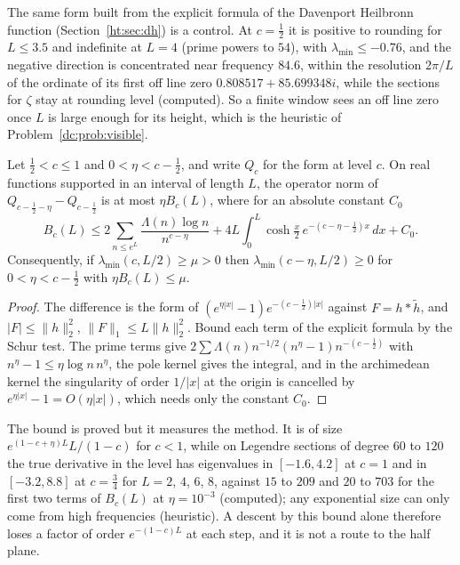 The same form built from the explicit formula of the Davenport Heilbronn function \cite{DH36} (Section~\ref{ht:sec:dh}) is a control. At $c=\frac12$ it is positive to rounding for $L\le3.5$ and indefinite at $L=4$ (prime powers to $54$), with $\lambda_{\min}\le-0.76$, and the negative direction is concentrated near frequency $84.6$, within the resolution $2\pi/L$ of the ordinate of its first off line zero $0.808517+85.699348i$, while the sections for $\zeta$ stay at rounding level (computed). So a finite window sees an off line zero once $L$ is large enough for its height, which is the heuristic of Problem~\ref{dc:prob:visible}.

\begin{proposition}\label{dc:prop:schur}
Let $\frac12<c\le1$ and $0<\eta<c-\frac12$, and write $Q_c$ for the form at level $c$. On real functions supported in an interval of length $L$, the operator norm of $Q_{c-\frac12-\eta}-Q_{c-\frac12}$ is at most $\eta B_c(L)$, where for an absolute constant $C_0$
\[
B_c(L)\le2\sum_{n\le e^L}\frac{\Lambda(n)\log n}{n^{c-\eta}}+4L\int_0^L\cosh\tfrac x2\,e^{-(c-\eta-\frac12)x}\,dx+C_0.
\]
Consequently, if $\lambda_{\min}(c,L/2)\ge\mu>0$ then $\lambda_{\min}(c-\eta,L/2)\ge0$ for $0<\eta<c-\frac12$ with $\eta B_c(L)\le\mu$.
\end{proposition}

\begin{proof}
The difference is the form of $(e^{\eta|x|}-1)e^{-(c-\frac12)|x|}$ against $F=h*\tilde h$, and $|F|\le\|h\|_2^2$, $\|F\|_1\le L\|h\|_2^2$. Bound each term of the explicit formula by the Schur test. The prime terms give $2\sum\Lambda(n)n^{-1/2}(n^\eta-1)n^{-(c-\frac12)}$ with $n^\eta-1\le\eta\log n\,n^\eta$, the pole kernel gives the integral, and in the archimedean kernel the singularity of order $1/|x|$ at the origin is cancelled by $e^{\eta|x|}-1=O(\eta|x|)$, which needs only the constant $C_0$.
\end{proof}

The bound is proved but it measures the method. It is of size $e^{(1-c+\eta)L}L/(1-c)$ for $c<1$, while on Legendre sections of degree $60$ to $120$ the true derivative in the level has eigenvalues in $[-1.6,4.2]$ at $c=1$ and in $[-3.2,8.8]$ at $c=\frac34$ for $L=2$, $4$, $6$, $8$, against $15$ to $209$ and $20$ to $703$ for the first two terms of $B_c(L)$ at $\eta=10^{-3}$ (computed); any exponential size can only come from high frequencies (heuristic). A descent by this bound alone therefore loses a factor of order $e^{-(1-c)L}$ at each step, and it is not a route to the half plane.


